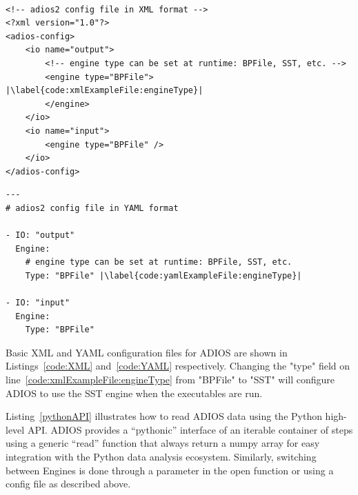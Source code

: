 \documentclass[x11names,table,xcdraw,graybox]{svmult}
\begin{document}
\begin{minipage}{\linewidth}
\begin{lstlisting}[frame=single,label={configXML},caption={Configuration file, "config.xml" for examples shown in Listing~\ref{code:writeExampleFile} and ~\ref{code:readExampleFile}}, label=code:XML]

<!-- adios2 config file in XML format -->
<?xml version="1.0"?>
<adios-config>
    <io name="output">
        <!-- engine type can be set at runtime: BPFile, SST, etc. -->
        <engine type="BPFile"> |\label{code:xmlExampleFile:engineType}|
        </engine>
    </io>
    <io name="input">
        <engine type="BPFile" />
    </io>
</adios-config>

\end{lstlisting}
\end{minipage}

\begin{minipage}{\linewidth}
\begin{lstlisting}[frame=single,label={configYAML},caption={Alternative configuration file, "config.yaml" for examples shown in Listing~\ref{code:writeExampleFile} and ~\ref{code:readExampleFile}}, label=code:YAML]
---
# adios2 config file in YAML format

- IO: "output"
  Engine:
    # engine type can be set at runtime: BPFile, SST, etc.
    Type: "BPFile" |\label{code:yamlExampleFile:engineType}|

- IO: "input"
  Engine:
    Type: "BPFile"

\end{lstlisting}
\end{minipage}

Basic XML and YAML configuration files for ADIOS are shown in Listings~\ref{code:XML} and~\ref{code:YAML} respectively. Changing the "type" field on line~\ref{code:xmlExampleFile:engineType} from "BPFile" to "SST" will configure ADIOS to use the SST engine when the executables are run.


Listing~\ref{pythonAPI} illustrates how to read ADIOS data using the Python high-level API.
ADIOS provides a ``pythonic'' interface of an iterable container of steps using a generic ``read'' function that always return a numpy array for easy integration with the Python data analysis ecosystem. Similarly, switching between Engines is done through a parameter in the open function or using a config file as described above.
\end{document}
